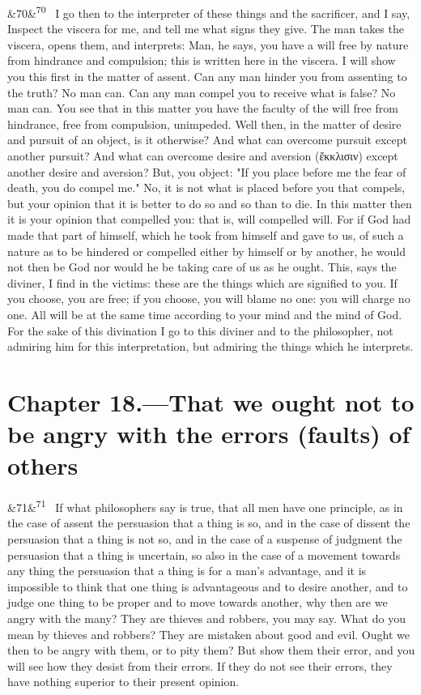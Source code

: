 \documentclass[12pt]{article}
\newcommand{\para}[1][]{\par\noindent\ifx&#1&\else\textsuperscript{\footnotesize #1}~\fi}
\begin{document}
\para[70] I go then to the interpreter of these things and the sacrificer, and I say, Inspect the viscera for me, and tell me what signs they give. The man takes the viscera, opens them, and interprets: Man, he says, you have a will free by nature from hindrance and compulsion; this is written here in the viscera. I will show you this first in the matter of assent. Can any man hinder you from assenting to the truth? No man can. Can any man compel you to receive what is false? No man can. You see that in this matter you have the faculty of the will free from hindrance, free from compulsion, unimpeded. Well then, in the matter of desire and pursuit of an object, is it otherwise? And what can overcome pursuit except another pursuit? And what can overcome desire and aversion (ἔκκλισιν) except another desire and aversion? But, you object: "If you place before me the fear of death, you do compel me." No, it is not what is placed before you that compels, but your opinion that it is better to do so and so than to die. In this matter then it is your opinion that compelled you: that is, will compelled will. For if God had made that part of himself, which he took from himself and gave to us, of such a nature as to be hindered or compelled either by himself or by another, he would not then be God nor would he be taking care of us as he ought. This, says the diviner, I find in the victims: these are the things which are signified to you. If you choose, you are free; if you choose, you will blame no one: you will charge no one. All will be at the same time according to your mind and the mind of God. For the sake of this divination I go to this diviner and to the philosopher, not admiring him for this interpretation, but admiring the things which he interprets.

\section*{Chapter 18.---That we ought not to be angry with the errors (faults) of others}

\para[71] If what philosophers say is true, that all men have one principle, as in the case of assent the persuasion that a thing is so, and in the case of dissent the persuasion that a thing is not so, and in the case of a suspense of judgment the persuasion that a thing is uncertain, so also in the case of a movement towards any thing the persuasion that a thing is for a man's advantage, and it is impossible to think that one thing is advantageous and to desire another, and to judge one thing to be proper and to move towards another, why then are we angry with the many? They are thieves and robbers, you may say. What do you mean by thieves and robbers? They are mistaken about good and evil. Ought we then to be angry with them, or to pity them? But show them their error, and you will see how they desist from their errors. If they do not see their errors, they have nothing superior to their present opinion.
\end{document}
